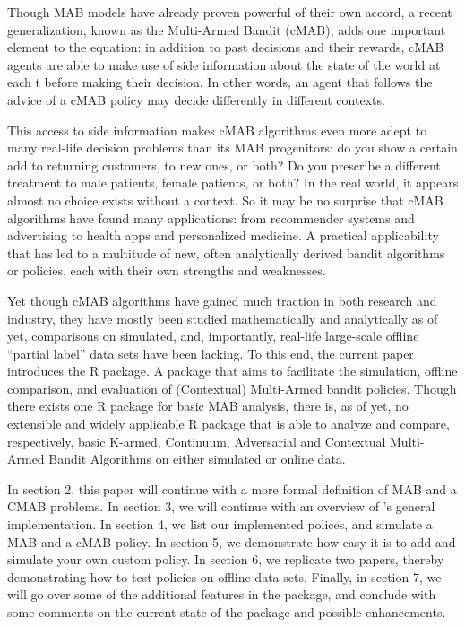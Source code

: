 \documentclass[nojss]{jss}\usepackage[]{graphicx}\usepackage[]{color}
\begin{document}
Though MAB models have already proven powerful of their own accord, a recent generalization, known as the  Multi-Armed Bandit (cMAB), adds one important element to the equation: in addition to past decisions and their rewards, cMAB agents are able to make use of side information about the state of the world at each t before making their decision. In other words, an agent that follows the advice of a cMAB policy may decide differently in different contexts.

This access to side information makes cMAB algorithms even more adept to many real-life decision problems than its MAB progenitors: do you show a certain add to returning customers, to new ones, or both? Do you prescribe a different treatment to male patients, female patients, or both? In the real world, it appears almost no choice exists without a context. So it may be no surprise that cMAB algorithms have found many applications: from recommender systems and advertising to health apps and personalized medicine. A practical applicability that has led to a multitude of new, often analytically derived bandit algorithms or policies, each with their own strengths and weaknesses.

Yet though cMAB algorithms have gained much traction in both research and industry, they have mostly been studied mathematically and analytically \textendash{} as of yet, comparisons on simulated, and, importantly, real-life large-scale offline \textquotedblleft{}partial label\textquotedblright{} data sets have been lacking. To this end, the current paper introduces the  R package. A package that aims to facilitate the simulation, offline comparison, and evaluation of (Contextual) Multi-Armed bandit policies. Though there exists one R package for basic MAB analysis, there is, as of yet, no extensible and widely applicable R package that is able to analyze and compare, respectively, basic K-armed, Continuum, Adversarial and Contextual Multi-Armed Bandit Algorithms on either simulated or online data.

In section 2, this paper will continue with a more formal definition of MAB and a CMAB problems. In section 3, we will continue with an overview of ’s general implementation. In section 4, we list our implemented polices, and simulate a MAB and a cMAB policy. In section 5, we demonstrate how easy it is to add and simulate your own custom policy. In section 6, we replicate two papers, thereby demonstrating how to test policies on offline data sets. Finally, in section  7, we will go over some of the additional features in the package, and conclude with some comments on the current state of the package and possible enhancements.
\end{document}

